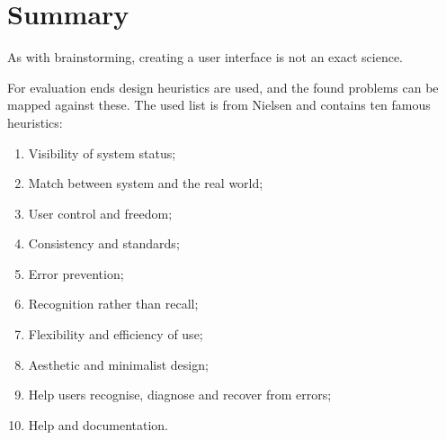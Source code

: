 

\section{Summary}
\label{evaluation-summary}

As with brainstorming, creating a user interface is not an exact science.

For evaluation ends design heuristics are used, and the found problems can be mapped against these.
The used list is from Nielsen \cite{designHeuristics} and contains ten famous heuristics:

\begin{enumerate}
	\item Visibility of system status;
	\item Match between system and the real world;
	\item User control and freedom;
	\item Consistency and standards;
	\item Error prevention;
	\item Recognition rather than recall;
	\item Flexibility and efficiency of use;
	\item Aesthetic and minimalist design;
	\item Help users recognise, diagnose and recover from errors;
	\item Help and documentation.
\end{enumerate}


